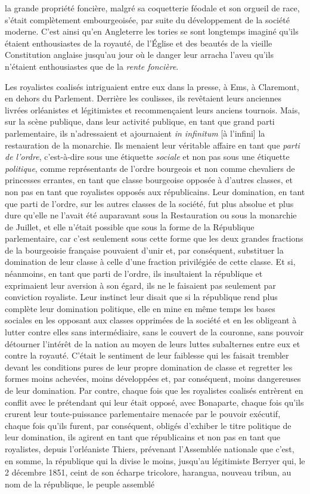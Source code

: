 \documentclass[french,twoside]{book} %
\begin{document}
la grande propriété foncière, malgré sa coquetterie féodale et son orgueil de race, s’était complètement embourgeoisée, par suite du développement de la société moderne. C’est ainsi qu’en Angleterre les tories se sont longtemps imaginé qu’ils étaient enthousiastes de la royauté, de l’Église et des beautés de la vieille Constitution anglaise jusqu’au jour où le danger leur arracha l’aveu qu’ils n’étaient enthousiastes que de la \emph{rente foncière}.\par
Les royalistes coalisés intriguaient entre eux dans la presse, à Ems, à Claremont, en dehors du Parlement. Derrière les coulisses, ils revêtaient leurs anciennes livrées orléanistes et légitimistes et recommençaient leurs anciens tournois. Mais, sur la scène publique, dans leur activité publique, en tant que grand parti parlementaire, ils n’adressaient et ajournaient \emph{in infinitum} [à l’infini] la restauration de la monarchie. Ils menaient leur véritable affaire en tant que \emph{parti de l’ordre}, c’est-à-dire sous une étiquette \emph{sociale} et non pas sous une étiquette \emph{politique}, comme représentants de l’ordre bourgeois et non comme chevaliers de princesses errantes, en tant que classe bourgeoise opposée à d’autres classes, et non pas en tant que royalistes opposés aux républicains. Leur domination, en tant que parti de l’ordre, sur les autres classes de la société, fut plus absolue et plus dure qu’elle ne l’avait été auparavant sous la Restauration ou sous la monarchie de Juillet, et elle n’était possible que sous la forme de la République parlementaire, car c’est seulement sous cette forme que les deux grandes fractions de la bourgeoisie française pouvaient d’unir et, par conséquent, substituer la domination de leur classe à celle d’une fraction privilégiée de cette classe. Et si, néanmoins, en tant que parti de l’ordre, ils insultaient la république et exprimaient leur aversion à son égard, ils ne le faisaient pas seulement par conviction royaliste. Leur instinct leur disait que si la république rend plus complète leur domination politique, elle en mine en même temps les bases sociales en les opposant aux classes opprimées de la société et en les obligeant à lutter contre elles sans intermédiaire, sans le couvert de la couronne, sans pouvoir détourner l’intérêt de la nation au moyen de leurs luttes subalternes entre eux et contre la royauté. C’était le sentiment de leur faiblesse qui les faisait trembler devant les conditions pures de leur propre domination de classe et regretter les formes moins achevées, moins développées et, par conséquent, moins dangereuses de leur domination. Par contre, chaque fois que les royalistes coalisés entrèrent en conflit avec le prétendant qui leur était opposé, avec Bonaparte, chaque fois qu’ils crurent leur toute-puissance parlementaire menacée par le pouvoir exécutif, chaque fois qu’ils furent, par conséquent, obligés d’exhiber le titre politique de leur domination, ils agirent en tant que républicains et non pas en tant que royalistes, depuis l’orléaniste Thiers, prévenant l’Assemblée nationale que c’est, en somme, la république qui la divise le moins, jusqu’au légitimiste Berryer qui, le 2 décembre 1851, ceint de son écharpe tricolore, harangua, nouveau tribun, au nom de la république, le peuple assemblé 
\end{document}
